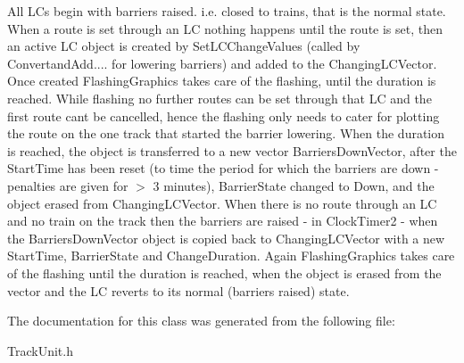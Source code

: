 All L\+Cs begin with barriers raised. i.\+e. closed to trains, that is the normal state. When a route is set through an LC nothing happens until the route is set, then an active LC object is created by Set\+L\+C\+Change\+Values (called by Convertand\+Add.... for lowering barriers) and added to the Changing\+L\+C\+Vector. Once created \textquotesingle{}Flashing\+Graphics\textquotesingle{} takes care of the flashing, until the duration is reached. While flashing no further routes can be set through that LC and the first route can\textquotesingle{}t be cancelled, hence the flashing only needs to cater for plotting the route on the one track that started the barrier lowering. When the duration is reached, the object is transferred to a new vector Barriers\+Down\+Vector, after the Start\+Time has been reset (to time the period for which the barriers are down -\/ penalties are given for $>$ 3 minutes), Barrier\+State changed to Down, and the object erased from Changing\+L\+C\+Vector. When there is no route through an LC and no train on the track then the barriers are raised -\/ in Clock\+Timer2 -\/ when the Barriers\+Down\+Vector object is copied back to Changing\+L\+C\+Vector with a new Start\+Time, Barrier\+State and Change\+Duration. Again Flashing\+Graphics takes care of the flashing until the duration is reached, when the object is erased from the vector and the LC reverts to its normal (barriers raised) state. 

The documentation for this class was generated from the following file\+:\begin{DoxyCompactItemize}
\item 
Track\+Unit.\+h\end{DoxyCompactItemize}
